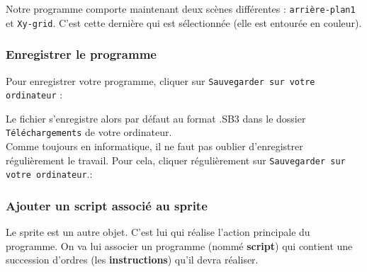 
Notre programme comporte maintenant deux scènes différentes : \texttt{arrière-plan1} et \texttt{Xy-grid}. C'est cette dernière qui est sélectionnée (elle est entourée en couleur).







\subsubsection{Enregistrer le programme}

Pour enregistrer votre programme, cliquer sur \texttt{Sauvegarder sur votre ordinateur} :


Le fichier s'enregistre alors par défaut au format .SB3 dans le dossier \texttt{Téléchargements} de votre ordinateur.\\




Comme toujours en informatique, il ne faut pas oublier d'enregistrer régulièrement le travail. Pour cela, cliquer régulièrement sur \texttt{Sauvegarder sur votre ordinateur}.:










\subsubsection{Ajouter un script associé au sprite}\label{ScriptLutin}

Le sprite est un autre objet. C'est lui qui réalise l'action principale du programme. On va lui associer un programme (nommé \textbf{script}) qui contient une succession d'ordres (les \textbf{instructions}) qu'il devra réaliser.  \\

